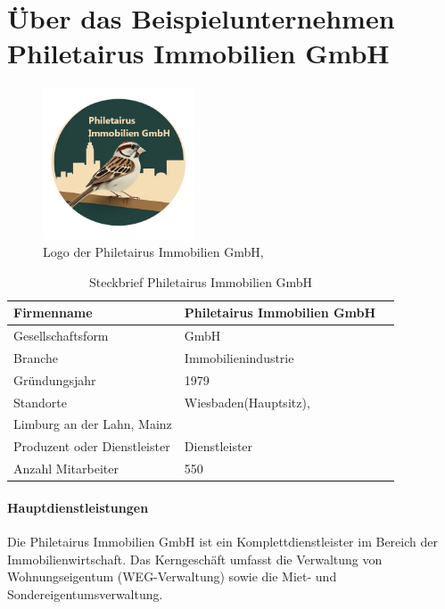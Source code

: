 \section*{Über das Beispielunternehmen Philetairus Immobilien GmbH}

\begin{figure}[!h]
\centering
\includegraphics[width=4.5cm, height=4.5cm]{PhiletairusLogo}
\caption{Logo der Philetairus  Immobilien GmbH, }
\end{figure}

\begin{table}[ht]
    \centering
    \begin{tabularx}{\textwidth}{|l|X|X|} 
        \hline
        Firmenname & Philetairus Immobilien GmbH\\
        \hline
        Gesellschaftsform & GmbH\\
        \hline
        Branche & Immobilienindustrie\\
        \hline
        Gründungsjahr & 1979\\
        \hline
        Standorte & Wiesbaden(Hauptsitz), \\ Limburg an der Lahn, Mainz\\
        \hline
        Produzent oder Dienstleister & Dienstleister\\
        \hline
        Anzahl Mitarbeiter & 550\\
        \hline
    \end{tabularx}
    \caption{Steckbrief Philetairus  Immobilien GmbH}
    \label{tab:firmenSteckbrief}
\end{table}

\paragraph{Hauptdienstleistungen}

Die Philetairus Immobilien GmbH ist ein Komplettdienstleister im Bereich der Immobilienwirtschaft. Das Kerngeschäft umfasst die Verwaltung von Wohnungseigentum (WEG-Verwaltung) sowie die Miet- und Sondereigentumsverwaltung. \\

